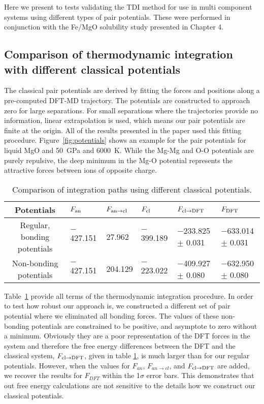 Here we present to tests validating the TDI method for use in multi component systems
using different types of pair potentials. These were performed in conjunction with
the Fe/MgO solubility study presented in Chapter 4.

\subsection{Comparison of thermodynamic integration with different classical potentials}

The classical pair potentials are derived by fitting the forces and
positions along a pre-computed DFT-MD trajectory. The potentials are
constructed to approach zero for large separations. For small separations
where the trajectories provide no information, linear extrapolation is
used, which means our pair potentials are finite at the origin. All of the
results presented in the paper used this fitting procedure.
Figure~\ref{fig:potentials} shows an example for the pair potentials for
liquid MgO and 50~GPa and 6000~K.  While the Mg-Mg and O-O potentials are
purely repulsive, the deep minimum in the Mg-O potential represents the
attractive forces between ions of opposite charge.

\begin{table}[!h]
    \centering
\caption{Comparison of integration paths using different classical potentials.\label{tab:compare_pots}}
\begin{adjustbox}{max width=\textwidth}
\begin{tabular}{clllll}
\hline
Potentials & $F_{\rm an}$ & $F_{\rm an \to cl}$ & $F_{\rm cl}$ & $F_{\rm cl \to DFT}$ & $F_{\rm DFT}$ \\
\hline
Regular, bonding potentials & $-$427.151 & 27.962 & $-$399.189 & $-$233.825 $\pm$ 0.031 & $-$633.014  $\pm$ 0.031 \\
Non-bonding potentials & $-$427.151 & 204.129 & $-$223.022 & $-$409.927 $\pm$ 0.080 & $-$632.950 $\pm$ 0.080 \\
\hline
\end{tabular}
\end{adjustbox}
\end{table}

Table~\ref{tab:compare_pots} provide all terms of the thermodynamic integration
procedure. In order to test how robust our approach is, we constructed a different
set of pair potential where we eliminated all bonding forces. The values of these
non-bonding potentials are constrained to be positive, and asymptote to zero without
a minimum. Obviously they are a poor representation of the DFT forces in the system
and therefore the free energy differences between the DFT and the classical system,
$F_{\rm cl \to DFT}$, given in table \ref{tab:compare_pots}, is much larger than for
our regular potentials.  However, when the values for $F_{an}$, $F_{an \to cl}$, and
$F_{\rm cl \to DFT}$ are added, we recover the results for $F_{DFT}$ within the
1$\sigma$ error bars. This demonstrates that out free energy calculations are not
sensitive to the details how we construct our classical potentials.

